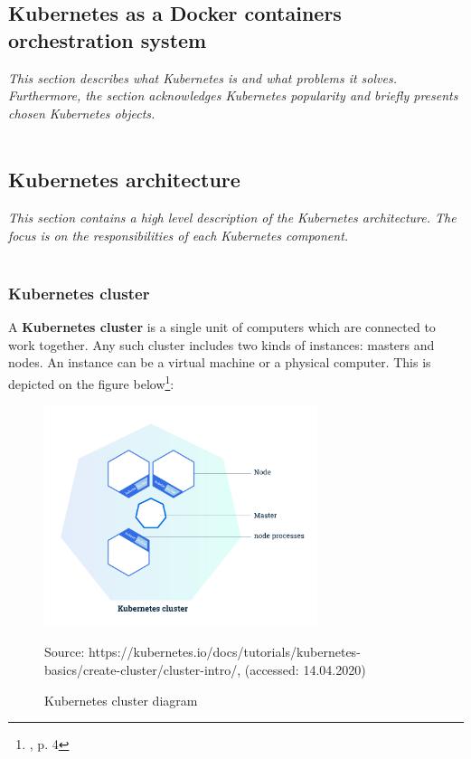 \subsection{Kubernetes as a Docker containers orchestration system}
\textit{This section describes what Kubernetes is and what problems it solves. Furthermore, the section acknowledges Kubernetes popularity and briefly presents chosen Kubernetes objects.}
~\\
~\\
\subsection{Kubernetes architecture}
\textit{This section contains a high level description of the Kubernetes architecture. The focus is on the responsibilities of each Kubernetes component.}
~\\
~\\
\subsubsection{Kubernetes cluster}
A \textbf{Kubernetes cluster} is a single unit of computers which are connected to work together. Any such cluster includes two kinds of instances: masters and nodes. An instance can be a virtual machine or a physical computer. This is depicted on the figure below\footnote{\cite{k8s-cluster}, p. 4}:
\begin{figure}[H]
    \centering
    \includegraphics[width=8cm]{figures/cluster.png}
    \label{fig:cluster}
    \caption{Kubernetes cluster diagram}
    \small{Source: https://kubernetes.io/docs/tutorials/kubernetes-basics/create-cluster/cluster-intro/, (accessed: 14.04.2020)}
\end{figure}

